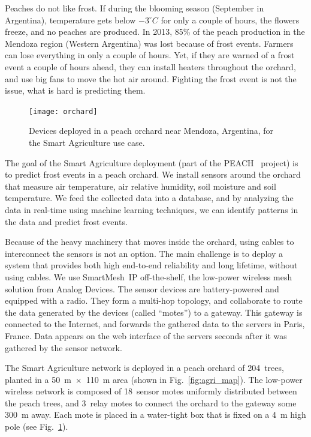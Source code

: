 \documentclass{elsarticle}
\newcommand{\smip}                {SmartMesh~IP\xspace}
\newcommand{\agri}                {Smart Agriculture\xspace}
\begin{document}

Peaches do not like frost.
If during the blooming season (September in Argentina), temperature gets below $-3^{\circ}C$ for only a couple of hours, the flowers freeze, and no peaches are produced.
In 2013, 85\% of the peach production in the Mendoza region (Western Argentina) was lost because of frost events.
Farmers can lose everything in only a couple of hours.
Yet, if they are warned of a frost event a couple of hours ahead, they can install heaters throughout the orchard, and use big fans to move the hot air around.
Fighting the frost event is not the issue, what is hard is predicting them.

\begin{figure}
    \centering
    \texttt{[image: orchard]}
    \caption{Devices deployed in a peach orchard near Mendoza, Argentina, for the \agri use case.}
    \label{fig:agri_pics}
\end{figure}


The goal of the \agri deployment (part of the PEACH~\cite{watteyne16peach} project) is to predict frost events in a peach orchard.
We install sensors around the orchard that measure air temperature, air relative humidity, soil moisture and soil temperature.
We feed the collected data into a database, and by analyzing the data in real-time using machine learning techniques, we can identify patterns in the data and predict frost events.


Because of the heavy machinery that moves inside the orchard, using cables to interconnect the sensors is not an option.
The main challenge is to deploy a system that provides both high end-to-end reliability and long lifetime, without using cables.
We use \smip off-the-shelf, the low-power wireless mesh solution from Analog Devices.
The sensor devices are battery-powered and equipped with a radio.
They form a multi-hop topology, and collaborate to route the data generated by the devices (called ``motes'') to a gateway.
This gateway is connected to the Internet, and forwards the gathered data to the servers in Paris, France.
Data appears on the web interface of the servers seconds after it was gathered by the sensor network.


The \agri network is deployed in a peach orchard of 204~trees, planted in a 50~m~$\times$~110~m area (shown in Fig.~\ref{fig:agri_map}).
The low-power wireless network is composed of 18~sensor motes uniformly distributed between the peach trees, and 3~relay motes to connect the orchard to the gateway some 300~m away.
Each mote is placed in a water-tight box that is fixed on a 4~m high pole (see Fig.~\ref{fig:agri_pics}).
\end{document}
